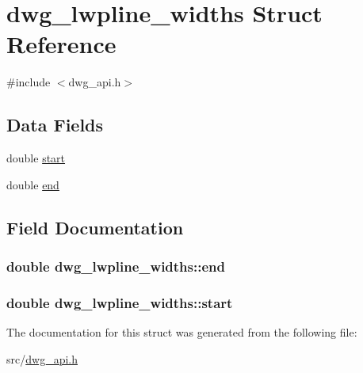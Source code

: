 \hypertarget{structdwg__lwpline__widths}{\section{dwg\-\_\-lwpline\-\_\-widths \-Struct \-Reference}
\label{structdwg__lwpline__widths}
}


{\ttfamily \#include $<$dwg\-\_\-api.\-h$>$}

\subsection*{\-Data \-Fields}
\begin{DoxyCompactItemize}
\item 
double \hyperlink{structdwg__lwpline__widths_a63f5162a1137b6f95b6ae65badb23893}{start}
\item 
double \hyperlink{structdwg__lwpline__widths_a2c9522960eed225332d35043e354077c}{end}
\end{DoxyCompactItemize}


\subsection{\-Field \-Documentation}
\hypertarget{structdwg__lwpline__widths_a2c9522960eed225332d35043e354077c}{
\subsubsection[{end}]{\setlength{\rightskip}{0pt plus 5cm}double {\bf dwg\-\_\-lwpline\-\_\-widths\-::end}}}\label{structdwg__lwpline__widths_a2c9522960eed225332d35043e354077c}
\hypertarget{structdwg__lwpline__widths_a63f5162a1137b6f95b6ae65badb23893}{
\subsubsection[{start}]{\setlength{\rightskip}{0pt plus 5cm}double {\bf dwg\-\_\-lwpline\-\_\-widths\-::start}}}\label{structdwg__lwpline__widths_a63f5162a1137b6f95b6ae65badb23893}


\-The documentation for this struct was generated from the following file\-:\begin{DoxyCompactItemize}
\item 
src/\hyperlink{dwg__api_8h}{dwg\-\_\-api.\-h}\end{DoxyCompactItemize}
